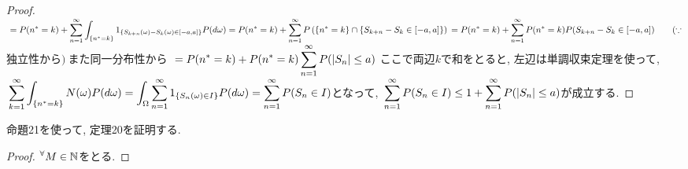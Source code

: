 \documentclass{jsarticle}
\begin{document}
\begin{proof}
$\displaystyle \\ = P( n^{*} = k ) + \sum_{n=1}^{\infty} \int_{ \left\{ n^{*} = k \right\} } {1_{ \left\{ S_{k+n}(\omega) - S_{k}(\omega) \in \left[-a,a\right] \right\}  } P (d\omega) } = P( n^{*} = k ) + \sum_{n=1}^{\infty} P\left( \left\{ n^{*}=k \right\} \cap  \left\{ S_{k+n} - S_{k} \in \left[-a,a\right] \right\}  \right) \\ =  P( n^{*} = k ) +  \sum_{n=1}^{\infty} P(n^{*} = k) P (S_{k+n} - S_{k} \in \left[-a,a\right]) \qquad ( \because$  独立性から$) \ $また同一分布性から 
$\displaystyle \\ = P( n^{*} = k ) + P(n^{*} = k) \sum_{n=1}^{\infty} P ( \left| S_{n} \right| \le a)$ ここで両辺$k$で和をとると, 左辺は単調収束定理を使って,
$\displaystyle \\ \sum_{k=1}^{\infty} \int_{ \left\{ n^{*} = k \right\} }{N(\omega) P (d\omega)} = \int_{ \Omega }{\sum_{n=1}^{\infty} 1_{ \left\{ S_{n}(\omega) \in I \right\} } P (d\omega)} = \sum_{n=1}^{\infty} P(S_{n} \in I )$となって,
$\displaystyle \\ \sum_{n=1}^{\infty} P(S_{n} \in I ) \le 1 + \sum_{n=1}^{\infty} P ( \left| S_{n} \right| \le a)$が成立する.
\end{proof}
 
 命題21を使って, 定理20を証明する.
 \begin{proof}
 $\displaystyle \\ {}^\forall M \in \mathbb{N}$をとる.
 \end{proof}
 
 
\end{document}
